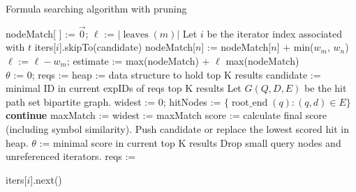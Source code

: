 \documentclass[runningheads]{llncs}
\begin{document}
\begin{algorithm}[!b]
\scriptsize
\caption{Formula searching algorithm with pruning}
\label{alg1}
\begin{algorithmic}[1]
	\State nodeMatch[ ] := $\vec{0}$; $\ell$ := $|\operatorname{leaves}(m)|$
 	    \State Let $i$ be the iterator index associated with $t$
			\State iters[$i$].skipTo(candidate)
		\EndIf
 			\State nodeMatch[$n$] := nodeMatch[$n$] + min($w_m$, $w_n$)
 		\EndFor
		\EndIf
		\State $\ell$ := $\ell - w_m$;
		\State estimate := max(nodeMatch) + $\ell$ 
			\State {}
		\EndIf
 	\EndFor
 	\State \Return max(nodeMatch)
\EndFunction
~\\
	\State $\theta$ := $0$; reqs := 
	\State heap := data structure to hold top K results
		\State candidate := minimal ID in current expIDs of reqs
			\State \Return top K results
		\EndIf
		\State Let $G(Q, D, E)$ be the hit path set bipartite graph.
		\State widest := 0; hitNodes := $\{\operatorname{root\_end}(q): (q, d) \in E \}$
				\State \textbf{continue}
			\EndIf
			\State maxMatch := 
			 widest := maxMatch  \EndIf
		\EndFor
		    \State score := calculate final score (including symbol similarity).
				\State Push candidate or replace the lowest scored hit in heap.
					\State $\theta$ := minimal score in current top K results
					\State Drop small query nodes and unreferenced iterators.
					\State reqs := 
				\EndIf
			\EndIf
		\EndIf

				iters[$i$].next()
			\EndIf
		\EndFor
	\EndWhile
\EndFunction
\end{algorithmic}
\end{algorithm}
\end{document}
